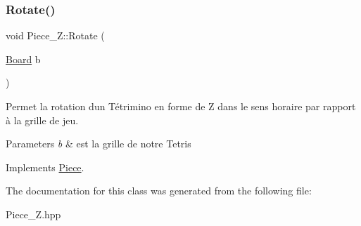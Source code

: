 \mbox{\label{classPiece__Z_a50d6c34030c7641b4827353b9b82a68e}} 
\subsubsection{\texorpdfstring{Rotate()}{Rotate()}}
{\footnotesize\ttfamily void Piece\+\_\+\+Z\+::\+Rotate (\begin{DoxyParamCaption}\item[{\hyperlink{classBoard}{Board}}]{b }\end{DoxyParamCaption})\hspace{0.3cm}{\ttfamily [virtual]}}



Permet la rotation d\textquotesingle{}un Tétrimino en forme de Z dans le sens horaire par rapport à la grille de jeu. 


\begin{DoxyParams}{Parameters}
{\em b} & est la grille de notre Tetris \\
\hline
\end{DoxyParams}


Implements \hyperlink{classPiece_a078f3cc6281cb8f60af3ae2266c651ba}{Piece}.



The documentation for this class was generated from the following file\+:\begin{DoxyCompactItemize}
\item 
Piece\+\_\+\+Z.\+hpp\end{DoxyCompactItemize}
